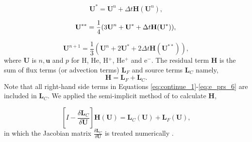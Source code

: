 \documentclass[journal, onecolumn]{aastex631}
\begin{document}
\begin{CJK*}{UTF8}{gbsn}
\begin{equation}\label{eq:RK3_1}
\textbf{U}^{*}=\textbf{U}^{n}+\Delta t\textbf{H}(\textbf{U}^{n}),
\end{equation}

\begin{equation}\label{eq:RK3_2}
\textbf{U}^{**}=\frac{1}{4}(3\textbf{U}^{n}+\textbf{U}^{*}+\Delta t\textbf{H}(\textbf{U}^{*})),\\
\end{equation}

\begin{equation}\label{eq:RK3_3}
\textbf{U}^{n+1}=\frac{1}{3}(\textbf{U}^{n}+2\textbf{U}^{*}+2\Delta t\textbf{H}(\textbf{U}^{**})),
\end{equation}
where \textbf{U} is $n, \textbf{u}$ and $p$ for H, He, H$^+$, He$^+$ and e$^-$. The residual term $\textbf{H}$ is the sum of flux terms (or advection terms) $\textbf{L}_{F}$ and source terms $\textbf{L}_{C}$ namely,
\begin{equation}\label{eq:H_C}
\textbf{H}=\textbf{L}_{F}+\textbf{L}_{C}.
\end{equation}
Note that all right-hand side terms in Equations \ref{eq:continue_1}-\ref{eq:e_prs_6} are included in $\textbf{L}_{C}$. We applied the semi-implicit method of \cite{Garcia2007} to calculate $\textbf{H}$,

\begin{equation}\label{eq: semi-implicit}
[I-\frac{\delta \textbf{L}_{C}}{\delta \textbf{U}}]\textbf{H}(\textbf{U})=
  \textbf{L}_{C}(\textbf{U})+ \textbf{L}_{F}(\textbf{U}),
\end{equation}
in which the Jacobian matrix $\frac{\delta \textbf{L}_{C}}{\delta \textbf{U}}$ is treated numerically \citep{Toth2012}.


\end{CJK*}
\end{document}

